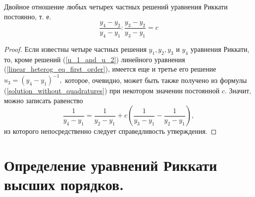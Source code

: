 \begin{cons}
   Двойное отношение любых четырех частных решений уравнения Риккати постоянно, т. е.
   $$\dfrac{y_4 - y_2}{y_4 - y_1} : \dfrac{y_3 - y_2}{y_3 - y_1} = c$$
\end{cons}
\begin{proof}
    Если известны четыре частных решения $y_1, y_2, y_3$ и $y_4$ уравнения Риккати, то, кроме решений (\ref{u_1_and_u_2}) линейного уравнения (\ref{linear_heterog_eq_first_order}), имеется еще и третье его решение $u_3 = (y_4 - y_1)^{-1},$ которое, очевидно, может быть также получено из формулы (\ref{solution_without_quadratures}) при некотором значении постоянной $c$. Значит, можно записать равенство
    $$\dfrac{1}{y_4 - y_1} = \dfrac{1}{y_2 - y_1} + c \left( \dfrac{1}{y_3 - y_1} - \dfrac{1}{y_2 - y_1} \right),$$
    из которого непосредственно следует справедливость утверждения.
\end{proof}

\section{Определение уравнений Риккати высших порядков.}

